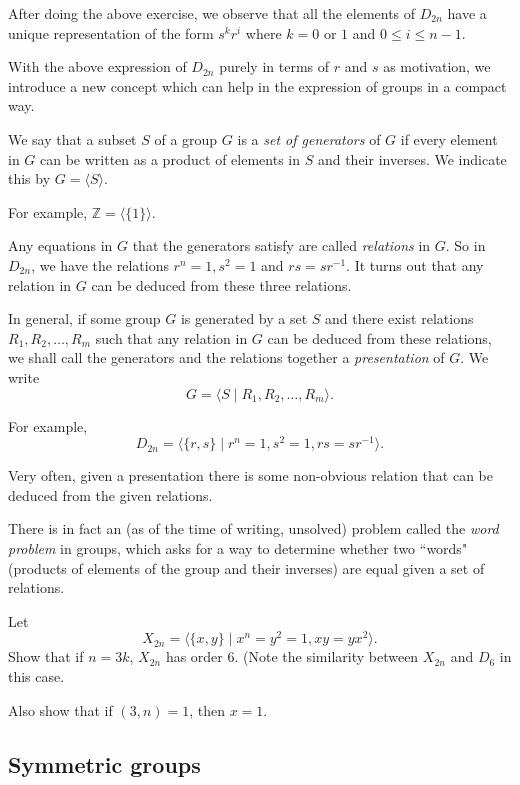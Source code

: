 After doing the above exercise, we observe that all the elements of $D_{2n}$ have a unique representation of the form $s^kr^i$ where $k=0\text{ or }1$ and $0\leq i\leq n-1$.

\vspace{4mm}
With the above expression of $D_{2n}$ purely in terms of $r$ and $s$ as motivation, we introduce a new concept which can help in the expression of groups in a compact way.
\begin{definition}
We say that a subset $S$ of a group $G$ is a \textit{set of generators} of $G$ if every element in $G$ can be written as a product of elements in $S$ and their inverses. We indicate this by $G=\langle S\rangle$. 
\end{definition}

For example, $\mathbb{Z}=\langle\{1\}\rangle$.

Any equations in $G$ that the generators satisfy are called \textit{relations} in $G$. So in $D_{2n}$, we have the relations $r^n=1, s^2=1$ and $rs=sr^{-1}$. It turns out that any relation in $G$ can be deduced from these three relations.

In general, if some group $G$ is generated by a set $S$ and there exist relations $R_1,R_2,\ldots,R_m$ such that any relation in $G$ can be deduced from these relations, we shall call the generators and the relations together a \textit{presentation} of $G$. We write $$G=\langle S\mid R_1, R_2,\ldots, R_m\rangle.$$

For example,
$$D_{2n}=\langle\{r,s\}\mid r^n=1, s^2=1, rs=sr^{-1}\rangle.$$

Very often, given a presentation there is some non-obvious relation that can be deduced from the given relations.

There is in fact an (as of the time of writing, unsolved) problem called the \textit{word problem} in groups, which asks for a way to determine whether two ``words" (products of elements of the group and their inverses) are equal given a set of relations.

\begin{exercise}
    Let
    $$X_{2n}=\langle\{x,y\}\mid x^n=y^2=1, xy=yx^2\rangle.$$
    Show that if $n=3k$, $X_{2n}$ has order $6$. (Note the similarity between $X_{2n}$ and $D_6$ in this case. 
    
    Also show that if $(3,n)=1$, then $x=1$.
\end{exercise}

\subsection{Symmetric groups}

